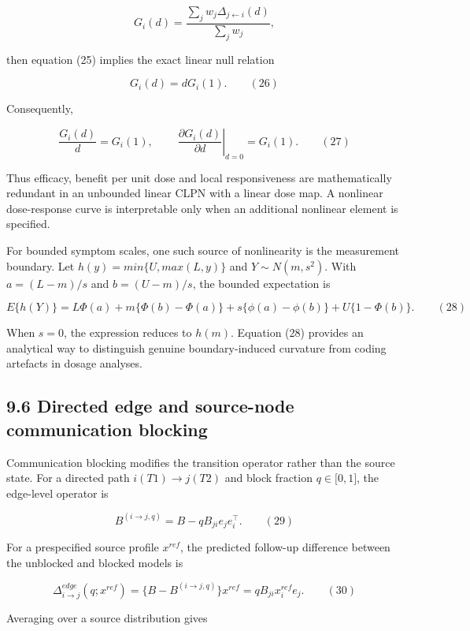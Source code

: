 \documentclass[11pt]{article}
\begin{document}
\[G_{i}(d) = \frac{\sum_{j}^{}w_{j}\Delta_{j \leftarrow i}(d)}{\sum_{j}^{}w_{j}},\]

then equation (25) implies the exact linear null relation

\[G_{i}(d) = dG_{i}(1).\quad\quad(26)\]

Consequently,

\[\frac{G_{i}(d)}{d} = G_{i}(1),\quad\quad\left. \ \frac{\partial G_{i}(d)}{\partial d} \right|_{d = 0} = G_{i}(1).\quad\quad(27)\]

Thus efficacy, benefit per unit dose and local responsiveness are
mathematically redundant in an unbounded linear CLPN with a linear dose
map. A nonlinear dose-response curve is interpretable only when an
additional nonlinear element is specified.

For bounded symptom scales, one such source of nonlinearity is the
measurement boundary. Let \(h(y) = min\{ U,max(L,y)\}\) and
\(Y \sim N\left( m,s^{2} \right)\). With \(a = (L - m)/s\) and
\(b = (U - m)/s\), the bounded expectation is

\[E\{ h(Y)\} = L\Phi(a) + m\{\Phi(b) - \Phi(a)\} + s\{\phi(a) - \phi(b)\} + U\{ 1 - \Phi(b)\}.\quad\quad(28)\]

When \(s = 0\), the expression reduces to \(h(m)\). Equation (28)
provides an analytical way to distinguish genuine boundary-induced
curvature from coding artefacts in dosage analyses.

\subsection{9.6 Directed edge and source-node communication
blocking}\label{directed-edge-and-source-node-communication-blocking}

Communication blocking modifies the transition operator rather than the
source state. For a directed path \(i(T1) \rightarrow j(T2)\) and block
fraction \(q \in \lbrack 0,1\rbrack\), the edge-level operator is

\[B^{(i \rightarrow j,q)} = B - qB_{ji}e_{j}e_{i}^{\top}.\quad\quad(29)\]

For a prespecified source profile \(x^{ref}\), the predicted follow-up
difference between the unblocked and blocked models is

\[\Delta_{i \rightarrow j}^{edge}\left( q;x^{ref} \right) = \{ B - B^{(i \rightarrow j,q)}\} x^{ref} = qB_{ji}x_{i}^{ref}e_{j}.\quad\quad(30)\]

Averaging over a source distribution gives
\end{document}
